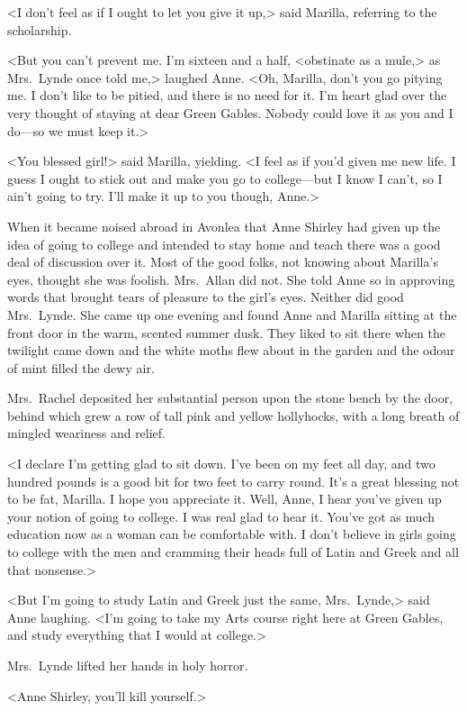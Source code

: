 <I don't feel as if I ought to let you give it up,> said Marilla, referring to the scholarship.

<But you can't prevent me. I'm sixteen and a half, <obstinate as a mule,> as Mrs.~Lynde once told me,> laughed Anne. <Oh, Marilla, don't you go pitying me. I don't like to be pitied, and there is no need for it. I'm heart glad over the very thought of staying at dear Green Gables. Nobody could love it as you and I do—so we must keep it.>

<You blessed girl!> said Marilla, yielding. <I feel as if you'd given me new life. I guess I ought to stick out and make you go to college—but I know I can't, so I ain't going to try. I'll make it up to you though, Anne.>

When it became noised abroad in Avonlea that Anne Shirley had given up the idea of going to college and intended to stay home and teach there was a good deal of discussion over it. Most of the good folks, not knowing about Marilla's eyes, thought she was foolish. Mrs.~Allan did not. She told Anne so in approving words that brought tears of pleasure to the girl's eyes. Neither did good Mrs.~Lynde. She came up one evening and found Anne and Marilla sitting at the front door in the warm, scented summer dusk. They liked to sit there when the twilight came down and the white moths flew about in the garden and the odour of mint filled the dewy air.

Mrs.~Rachel deposited her substantial person upon the stone bench by the door, behind which grew a row of tall pink and yellow hollyhocks, with a long breath of mingled weariness and relief.

<I declare I'm getting glad to sit down. I've been on my feet all day, and two hundred pounds is a good bit for two feet to carry round. It's a great blessing not to be fat, Marilla. I hope you appreciate it. Well, Anne, I hear you've given up your notion of going to college. I was real glad to hear it. You've got as much education now as a woman can be comfortable with. I don't believe in girls going to college with the men and cramming their heads full of Latin and Greek and all that nonsense.>

<But I'm going to study Latin and Greek just the same, Mrs.~Lynde,> said Anne laughing. <I'm going to take my Arts course right here at Green Gables, and study everything that I would at college.>

Mrs.~Lynde lifted her hands in holy horror.

<Anne Shirley, you'll kill yourself.>

